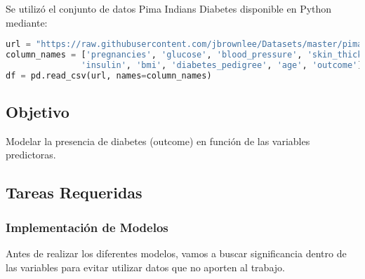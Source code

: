 \documentclass[12pt,a4paper]{article}
\begin{document}
Se utilizó el conjunto de datos Pima Indians Diabetes disponible en Python mediante:

\begin{lstlisting}[language=Python, frame=single, basicstyle=\ttfamily\small, breaklines=true]
url = "https://raw.githubusercontent.com/jbrownlee/Datasets/master/pima-indians-diabetes.data.csv"
column_names = ['pregnancies', 'glucose', 'blood_pressure', 'skin_thickness',
               'insulin', 'bmi', 'diabetes_pedigree', 'age', 'outcome']
df = pd.read_csv(url, names=column_names)
\end{lstlisting}

\subsection{Objetivo}

Modelar la presencia de diabetes (outcome) en función de las variables predictoras.

\subsection{Tareas Requeridas}

\subsubsection{Implementación de Modelos}

Antes de realizar los diferentes modelos, vamos a buscar significancia dentro de las variables para evitar utilizar datos que no aporten al trabajo.
\end{document}
